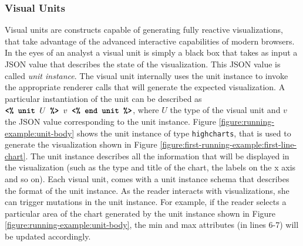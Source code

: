 \subsubsection*{Visual Units}
Visual units are constructs capable of generating fully reactive visualizations, that take advantage of the advanced interactive capabilities of modern browsers. In the eyes of an analyst a visual unit is simply a black box that takes as input a JSON value that describes the state of the visualization. This JSON value is called \emph{unit instance}. The visual unit internally uses the unit instance to invoke the appropriate renderer calls that will generate the expected visualization. A particular instantiation of the unit  can be described as $\texttt{\textbf{<\% unit }} U \texttt{\textbf{ \%> }} v \texttt{\textbf{ <\% end unit \%>}}$, where $U$ the type of the visual unit and $v$ the JSON value corresponding to the unit instance. Figure \ref{figure:running-example:unit-body} shows the unit instance of type \texttt{highcharts}, that is used to generate the visualization shown in Figure \ref{figure:first-running-example:first-line-chart}. The unit instance describes all the information that will be displayed in the visualization (such as the type and title of the chart, the labels on the x axis and so on). Each visual unit, comes with a unit instance schema that describes the format of the unit instance. As the reader interacts with visualizations, she can trigger mutations in the unit instance. For example, if the reader selects a particular area of the chart generated by the unit instance shown in Figure \ref{figure:running-example:unit-body}, the min and max attributes (in lines 6-7) will be updated accordingly.


